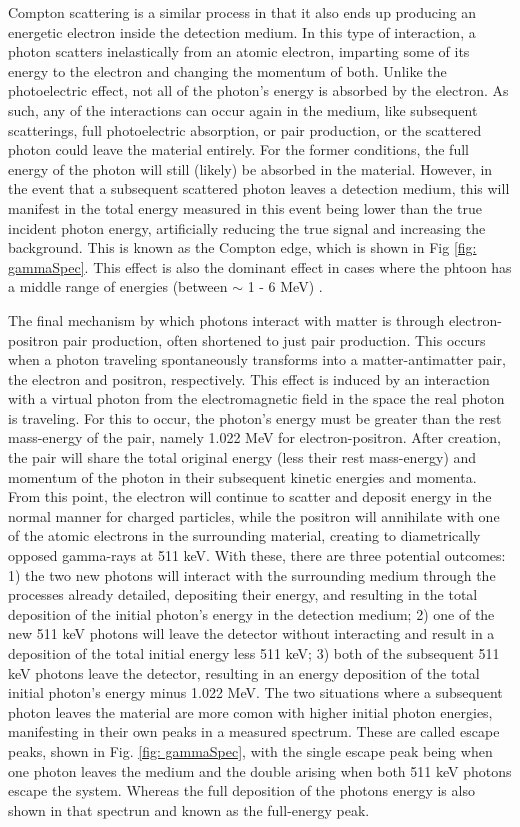 Compton scattering is a similar process in that it also ends up producing an energetic electron inside the detection medium. In this type of interaction, a photon scatters inelastically from an atomic electron, imparting some of its energy to the electron and changing the momentum of both. Unlike the photoelectric effect, not all of the photon's energy is absorbed by the electron. As such, any of the interactions can occur again in the medium, like subsequent scatterings, full photoelectric absorption, or pair production, or the scattered photon could leave the material entirely. For the former conditions, the full energy of the photon will still (likely) be absorbed in the material. However, in the event that a subsequent scattered photon leaves a detection medium, this will manifest in the total energy measured in this event being lower than the true incident photon energy, artificially reducing the true signal and increasing the background. This is known as the Compton edge, which is shown in Fig \ref{fig: gammaSpec}. This effect is also the dominant effect in cases where the phtoon has a middle range of energies (between $\sim$ 1 - 6 MeV) \cite{KnollBook}.

The final mechanism by which photons interact with matter is through electron-positron pair production, often shortened to just pair production. This occurs when a photon traveling spontaneously transforms into a matter-antimatter pair, the electron and positron, respectively.  This effect is induced by an interaction with a virtual photon from the electromagnetic field in the space the real photon is traveling. For this to occur, the photon's energy must be greater than the rest mass-energy of the pair, namely 1.022 MeV for electron-positron. After creation, the pair will share the total original energy (less their rest mass-energy) and momentum of the photon in their subsequent kinetic energies and momenta. From this point, the electron will continue to scatter and deposit energy in the normal manner for charged particles, while the positron will annihilate with one of the atomic electrons in the surrounding material, creating to diametrically opposed gamma-rays at 511 keV. With these, there are three potential outcomes: 1) the two new photons will interact with the surrounding medium through the processes already detailed, depositing their energy, and resulting in the total deposition of the initial photon's energy in the detection medium; 2) one of the new 511 keV photons will leave the detector without interacting and result in a deposition of the total initial energy less 511 keV; 3) both of the subsequent 511 keV photons leave the detector, resulting in an energy deposition of the total initial photon's energy minus 1.022 MeV. The two situations where a subsequent photon leaves the material are more comon with higher initial photon energies, manifesting in their own peaks in a measured spectrum. These are called escape peaks, shown in Fig. \ref{fig: gammaSpec}, with the single escape peak being when one photon leaves the medium and the double arising when both 511 keV photons escape the system. Whereas the full deposition of the photons energy is also shown in that spectrun and known as the full-energy peak. 

